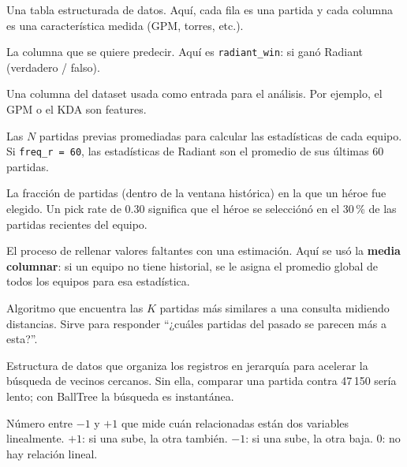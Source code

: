 \documentclass[12pt,a4paper]{article}
\begin{document}
\begin{description}[leftmargin=4.2cm, style=nextline, itemsep=5pt]

  \item[Dataset] Una tabla estructurada de datos. Aqu\'i, cada fila es una partida
    y cada columna es una caracter\'istica medida (GPM, torres, etc.).

  \item[Variable objetivo] La columna que se quiere predecir. Aqu\'i es
    \texttt{radiant\_win}: si gan\'o Radiant (verdadero / falso).

  \item[Feature / Atributo] Una columna del dataset usada como entrada para el
    an\'alisis. Por ejemplo, el GPM o el KDA son features.

  \item[Ventana hist\'orica] Las $N$ partidas previas promediadas para calcular
    las estad\'isticas de cada equipo. Si \texttt{freq\_r = 60}, las estad\'isticas
    de Radiant son el promedio de sus \'ultimas 60 partidas.

  \item[Pick rate] La fracci\'on de partidas (dentro de la ventana hist\'orica) en
    la que un h\'eroe fue elegido. Un pick rate de 0.30 significa que el h\'eroe
    se selecci\'on\'o en el 30\,\% de las partidas recientes del equipo.

  \item[Imputaci\'on] El proceso de rellenar valores faltantes con una estimaci\'on.
    Aqu\'i se us\'o la \textbf{media columnar}: si un equipo no tiene historial,
    se le asigna el promedio global de todos los equipos para esa estad\'istica.

  \item[KNN (K-Nearest Neighbors)] Algoritmo que encuentra las $K$ partidas m\'as
    similares a una consulta midiendo distancias. Sirve para responder
    ``¿cu\'ales partidas del pasado se parecen m\'as a esta?''.

  \item[BallTree] Estructura de datos que organiza los registros en jerarqu\'ia
    para acelerar la b\'usqueda de vecinos cercanos. Sin ella, comparar una
    partida contra 47\,150 ser\'ia lento; con BallTree la b\'usqueda es instant\'anea.

  \item[Correlaci\'on de Pearson] N\'umero entre $-1$ y $+1$ que mide cu\'an
    relacionadas est\'an dos variables linealmente. $+1$: si una sube, la otra
    tambi\'en. $-1$: si una sube, la otra baja. $0$: no hay relaci\'on lineal.


\end{description}
\end{document}
